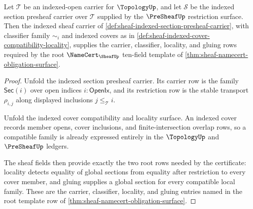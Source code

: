\begin{theorem}
\label{thm:sheaf-root-cover-locality-gluing-obligation}
Let $\mathcal{T}$ be an indexed-open carrier for $\TopologyUp$, and let $\mathcal{S}$ be the indexed section presheaf carrier over $\mathcal{T}$ supplied by the $\PreSheafUp$ restriction surface. Then the indexed sheaf carrier of \autoref{def:sheaf-indexed-section-presheaf-carrier}, with classifier family $\sim_i$ and indexed covers as in \autoref{def:sheaf-indexed-cover-compatibility-locality}, supplies the carrier, classifier, locality, and gluing rows required by the root $\NameCert_{\SheafUp}$ ten-field template of \autoref{thm:sheaf-namecert-obligation-surface}.
\end{theorem}
\begin{proof}
Unfold the indexed section presheaf carrier. Its carrier row is the family $\mathsf{Sec}(i)$ over open indices $i:\mathsf{OpenIx}$, and its restriction row is the stable transport $\rho_{i,j}$ along displayed inclusions $j\le_{\mathcal{T}} i$.

Unfold the indexed cover compatibility and locality surface. An indexed cover records member opens, cover inclusions, and finite-intersection overlap rows, so a compatible family is already expressed entirely in the $\TopologyUp$ and $\PreSheafUp$ ledgers.

The sheaf fields then provide exactly the two root rows needed by the certificate: locality detects equality of global sections from equality after restriction to every cover member, and gluing supplies a global section for every compatible local family. These are the carrier, classifier, locality, and gluing entries named in the root template row of \autoref{thm:sheaf-namecert-obligation-surface}.
\end{proof}

